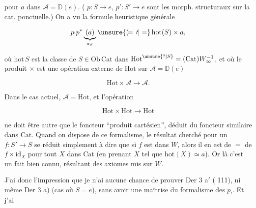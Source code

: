 
pour  $a$ dans $\mathcal A=\mathbb D(e)$. ( $p:S\longrightarrow e$, $p':S'\longrightarrow e$ sont les morph. structuraux sur la cat. ponctuelle.) On a vu la formule heuristique générale

\[
p_!p^*\underbrace{(a)}_{a_S}\unsure{(\!=\,\prime|=}\,\mathrm{hot}(S)\times a,
\]

où $\mathrm{hot}\,S$ est la classe de $S\in\mathrm{Ob}\,\mathrm{Cat}$ dans $\mathrm{Hot}^{\unsure{?|S}}=(\mathrm{Cat})W_\infty^{-1}$, et où le produit $\times$ est une opération externe de $\mathrm{Hot}$ sur $\mathcal A=\mathbb D(e)$

\[
\mathrm{Hot}\times\mathcal A\longrightarrow\mathcal A.
\]

Dans le cas actuel, $\mathcal A=\mathrm{Hot}$, et l'opération

\[
\mathrm{Hot}\times\mathrm{Hot}\longrightarrow\mathrm{Hot}
\]

ne doit être autre que le  foncteur ``produit cartésien'',  déduit du foncteur similaire dans $\mathrm{Cat}$. Quand on dispose de ce formalisme, le résultat cherché pour un $f:S'\longrightarrow S$ se réduit simplement à dire que si $f$ est dans $W$, alors il en est de $=$ de $f\times\mathrm{id}_X$ pour tout $X$ dans $\mathrm{Cat}$ (en prenant $X$ tel que $\mathrm{hot}(X)\simeq a$). Or là c'est un fait bien connu, résultant des axiomes mis sur $W$.

J'ai donc l'impression que je n'ai aucune chance de prouver Der 3 a$'$ ( 111), ni même Der 3 a) (cas où $S=e$), sans avoir une maîtrise du formalisme des $p_!$. Et j'ai
